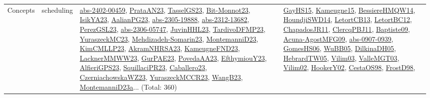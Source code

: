 {\begin{longtable}{lp{3cm}>{\raggedright}p{6cm}>{\raggedright}p{6cm}p{8cm}}
Concepts & scheduling & \href{articles/abs-2402-00459.pdf}{abs-2402-00459}\cite{abs-2402-00459}, \href{articles/PrataAN23.pdf}{PrataAN23}\cite{PrataAN23}, \href{papers/TasselGS23.pdf}{TasselGS23}\cite{TasselGS23}, \href{papers/Bit-Monnot23.pdf}{Bit-Monnot23}\cite{Bit-Monnot23}, \href{articles/IsikYA23.pdf}{IsikYA23}\cite{IsikYA23}, \href{papers/AalianPG23.pdf}{AalianPG23}\cite{AalianPG23}, \href{articles/abs-2305-19888.pdf}{abs-2305-19888}\cite{abs-2305-19888}, \href{articles/abs-2312-13682.pdf}{abs-2312-13682}\cite{abs-2312-13682}, \href{papers/PerezGSL23.pdf}{PerezGSL23}\cite{PerezGSL23}, \href{articles/abs-2306-05747.pdf}{abs-2306-05747}\cite{abs-2306-05747}, \href{papers/JuvinHHL23.pdf}{JuvinHHL23}\cite{JuvinHHL23}, \href{papers/TardivoDFMP23.pdf}{TardivoDFMP23}\cite{TardivoDFMP23}, \href{papers/YuraszeckMC23.pdf}{YuraszeckMC23}\cite{YuraszeckMC23}, \href{papers/Mehdizadeh-Somarin23.pdf}{Mehdizadeh-Somarin23}\cite{Mehdizadeh-Somarin23}, \href{articles/MontemanniD23.pdf}{MontemanniD23}\cite{MontemanniD23}, \href{papers/KimCMLLP23.pdf}{KimCMLLP23}\cite{KimCMLLP23}, \href{articles/AkramNHRSA23.pdf}{AkramNHRSA23}\cite{AkramNHRSA23}, \href{papers/KameugneFND23.pdf}{KameugneFND23}\cite{KameugneFND23}, \href{articles/LacknerMMWW23.pdf}{LacknerMMWW23}\cite{LacknerMMWW23}, \href{articles/GurPAE23.pdf}{GurPAE23}\cite{GurPAE23}, \href{papers/PovedaAA23.pdf}{PovedaAA23}\cite{PovedaAA23}, \href{papers/EfthymiouY23.pdf}{EfthymiouY23}\cite{EfthymiouY23}, \href{articles/AlfieriGPS23.pdf}{AlfieriGPS23}\cite{AlfieriGPS23}, \href{papers/SquillaciPR23.pdf}{SquillaciPR23}\cite{SquillaciPR23}, \href{articles/Caballero23.pdf}{Caballero23}\cite{Caballero23}, \href{articles/CzerniachowskaWZ23.pdf}{CzerniachowskaWZ23}\cite{CzerniachowskaWZ23}, \href{articles/YuraszeckMCCR23.pdf}{YuraszeckMCCR23}\cite{YuraszeckMCCR23}, \href{papers/WangB23.pdf}{WangB23}\cite{WangB23}, \href{articles/MontemanniD23a.pdf}{MontemanniD23a}\cite{MontemanniD23a}... (Total: 360) & \href{papers/GayHS15.pdf}{GayHS15}\cite{GayHS15}, \href{articles/Kameugne15.pdf}{Kameugne15}\cite{Kameugne15}, \href{papers/BessiereHMQW14.pdf}{BessiereHMQW14}\cite{BessiereHMQW14}, \href{papers/HoundjiSWD14.pdf}{HoundjiSWD14}\cite{HoundjiSWD14}, \href{papers/LetortCB13.pdf}{LetortCB13}\cite{LetortCB13}, \href{papers/LetortBC12.pdf}{LetortBC12}\cite{LetortBC12}, \href{papers/ChapadosJR11.pdf}{ChapadosJR11}\cite{ChapadosJR11}, \href{papers/ClercqPBJ11.pdf}{ClercqPBJ11}\cite{ClercqPBJ11}, \href{papers/Baptiste09.pdf}{Baptiste09}\cite{Baptiste09}, \href{papers/Acuna-AgostMFG09.pdf}{Acuna-AgostMFG09}\cite{Acuna-AgostMFG09}, \href{articles/abs-0907-0939.pdf}{abs-0907-0939}\cite{abs-0907-0939}, \href{papers/GomesHS06.pdf}{GomesHS06}\cite{GomesHS06}, \href{papers/WuBB05.pdf}{WuBB05}\cite{WuBB05}, \href{papers/DilkinaDH05.pdf}{DilkinaDH05}\cite{DilkinaDH05}, \href{papers/HebrardTW05.pdf}{HebrardTW05}\cite{HebrardTW05}, \href{papers/Vilim03.pdf}{Vilim03}\cite{Vilim03}, \href{papers/ValleMGT03.pdf}{ValleMGT03}\cite{ValleMGT03}, \href{papers/Vilim02.pdf}{Vilim02}\cite{Vilim02}, \href{papers/HookerY02.pdf}{HookerY02}\cite{HookerY02}, \href{papers/CestaOS98.pdf}{CestaOS98}\cite{CestaOS98}, \href{papers/FrostD98.pdf}{FrostD98}\cite{FrostD98}, 
\end{longtable}}
